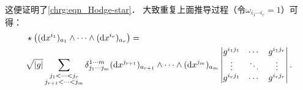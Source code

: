 这便证明了\eqref{chrg:eqn_Hodge-star}．
大致重复上面推导过程（令$\omega_{i_1\cdots i_r}=1$）可得：
\begin{align}
    &\star \bigl( ({\rm d}x^{i_{1}})_{a_{1}} \wedge \cdots \wedge ({\rm d}x^{i_r})_{a_r}\bigr) =\notag \\
    & \sqrt{|g|} \sum_{\substack {j_1<\cdots<j_r \\ j_{r+1}<\cdots<j_m}}
    \delta_{j_1 \cdots j_m}^{1 \cdots m}
    ({\rm d}x^{j_{r+1}})_{a_{r+1}} \wedge \cdots \wedge ({\rm d}x^{j_m})_{a_m}
    \begin{vmatrix}
        g^{i_1 j_1} & \cdots & g^{i_1 j_r}  \\
        \vdots & \ddots & \vdots \\
        g^{i_r j_1} & \cdots & g^{i_r j_r}  \\
    \end{vmatrix}.    \label{chrg:eqn_dx1r-Hodge}
\end{align}
